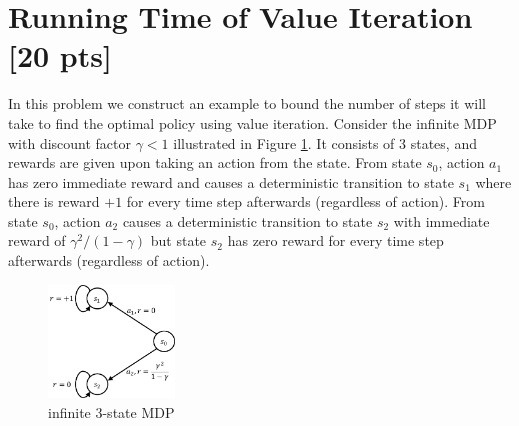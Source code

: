 \documentclass[11pt]{article}
\begin{document}
\section{Running Time of Value Iteration [20 pts]}
In this problem we construct an example to bound the number of steps it will take to find the optimal policy using value iteration. Consider the infinite MDP with discount factor $\gamma < 1$ illustrated in Figure \ref{fig:Q2}. It consists of 3 states, and rewards are given upon taking an action from the state. From state $s_0$, action $a_1$ has zero immediate reward and causes a deterministic transition to state $s_1$ where there is reward $+1$ for every time step afterwards (regardless of action). From state $s_0$, action $a_2$ causes a deterministic transition to state $s_2$ with immediate reward of $\gamma^2/(1-\gamma)$ but state $s_2$ has zero reward for every time step afterwards (regardless of action).

\begin{figure}[h]
  \centering
    \includegraphics[width=0.3\textwidth]{Q2.pdf}
    \caption{infinite 3-state MDP}
  	\label{fig:Q2}
\end{figure}
\end{document}
